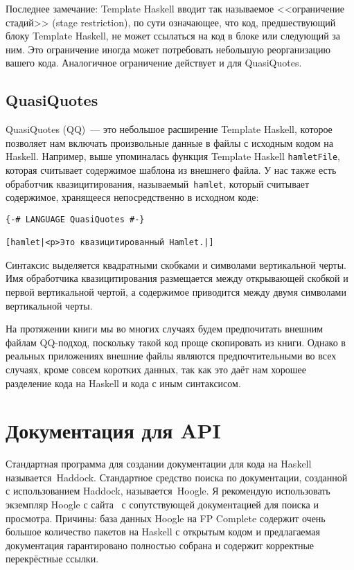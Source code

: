 Последнее замечание: Template Haskell вводит так называемое <<ограничение
стадий>> (stage restriction), по сути означающее, что код, предшествующий блоку
Template Haskell, не может ссылаться на код в блоке или следующий за ним. Это
ограничение иногда может потребовать небольшую реорганизацию вашего кода.
Аналогичное ограничение действует и для QuasiQuotes.

\subsection{QuasiQuotes}

QuasiQuotes (QQ)~--- это небольшое расширение Template Haskell, которое
позволяет нам включать произвольные данные в файлы с исходным кодом на Haskell.
Например, выше упоминалась функция Template Haskell \lstinline'hamletFile',
которая считывает содержимое шаблона из внешнего файла. У нас также есть
обработчик квазицитирования, называемый~\lstinline'hamlet', который считывает
содержимое, хранящееся непосредственно в исходном коде:

\begin{lstlisting}
{-# LANGUAGE QuasiQuotes #-}

[hamlet|<p>Это квазицитированный Hamlet.|]
\end{lstlisting}

Синтаксис выделяется квадратными скобками и символами вертикальной черты. Имя
обработчика квазицитирования размещается между открывающей скобкой и первой
вертикальной чертой, а содержимое приводится между двумя символами вертикальной
черты.

На протяжении книги мы во многих случаях будем предпочитать внешним файлам
QQ-подход, поскольку такой код проще скопировать из книги. Однако в реальных
приложениях внешние файлы являются предпочтительными во всех случаях, кроме
совсем коротких данных, так как это даёт нам хорошее разделение кода на Haskell
и кода с иным синтаксисом.

\section{Документация для API}
Стандартная программа для создании документации для кода на Haskell
называется~Haddock. Стандартное средство поиска по документации, созданной с
использованием Haddock, называется~Hoogle. Я рекомендую использовать экземпляр
Hoogle с сайта~
с сопутствующей документацией для поиска и просмотра. Причины: база данных
Hoogle на FP Complete содержит очень большое количество пакетов на Haskell с
открытым кодом и предлагаемая документация гарантировано полностью собрана и
содержит корректные перекрёстные ссылки.

